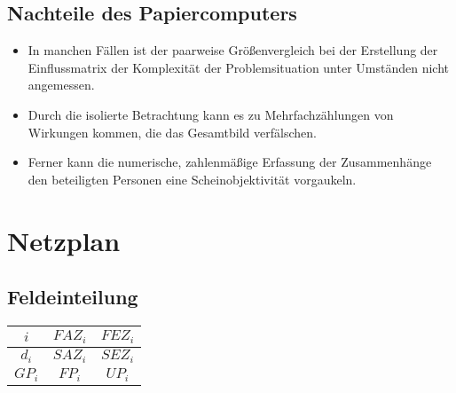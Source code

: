\documentclass[a4paper,12pt]{scrartcl}
\begin{document}
\subsection{Nachteile des Papiercomputers}
\begin{itemize}
\item In manchen Fällen ist der paarweise Größenvergleich bei der Erstellung der Einflussmatrix der Komplexität der Problemsituation unter Umständen nicht angemessen.
\item Durch die isolierte Betrachtung kann es zu Mehrfachzählungen von Wirkungen kommen, die das Gesamtbild verfälschen.
\item Ferner kann die numerische, zahlenmäßige Erfassung der Zusammenhänge den beteiligten Personen eine Scheinobjektivität vorgaukeln.
\end{itemize}

\section{Netzplan}
\subsection{Feldeinteilung}
\begin{table}[ht]
\centering
\begin{tabular}{|c|c|c|}
\hline
  $i$ & $FAZ_i$ & $FEZ_i$ \\
\hline  
  $d_i$ & $SAZ_i$ & $SEZ_i$ \\
\hline
  $GP_i$ & $FP_i$ & $UP_i$ \\
\hline
 \end{tabular}
\end{table}%
 
\end{document}
